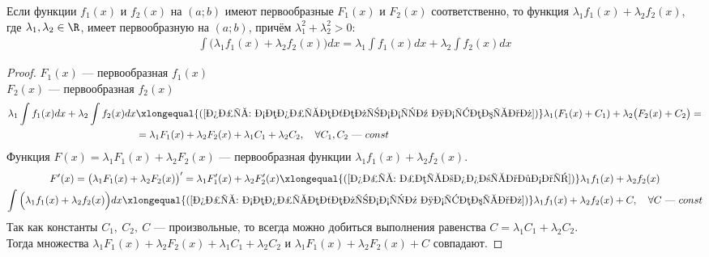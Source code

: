 \begin{property}
    Если функции $f_1(x)$ и $f_2(x)$ на $(a;b)$ имеют первообразные $F_1(x)$ и $F_2(x)$ соответственно, то функция $\lambda_1 f_1(x) + \lambda_2 f_2(x)$, где $\lambda_1, \lambda_2 \in \R$, имеет первообразную на $(a;b)$, причём $\lambda_1^2 + \lambda_2^2 > 0\colon$
    \begin{gather*}
        \int\Big(\lambda_1 f_1(x) + \lambda_2 f_2(x)\Big)dx = \lambda_1 \int f_1(x)dx + \lambda_2 \int f_2(x)dx
    \end{gather*}
\end{property}
\begin{proof}
    $F_1(x)$ --- первообразная $f_1(x)$\\
    $F_2(x)$ --- первообразная $f_2(x)$\\
    \begin{align*}
        \lambda_1 \int f_1(x)dx + \lambda_2 \int f_2(x)dx &\xlongequal{(\ref{опр: неопределённый интеграл})} \lambda_1 (F_1(x) + C_1) + \lambda_2 \big(F_2(x) + C_2\big) = \\
        &= \lambda_1 F_1(x) + \lambda_2 F_2(x) + \lambda_1 C_1 + \lambda_2 C_2,\quad \forall C_1, C_2 \text{ --- } const
    \end{align*}
    Функция $F(x) = \lambda_1 F_1(x) + \lambda_2 F_2(x)$ --- первообразная функции $\lambda_1 f_1(x) + \lambda_2 f_2 (x)$.
    \begin{gather*}
        F'(x) = \big(\lambda_1 F_1(x) + \lambda_2 F_2 (x)\big)' = \lambda_1 F_1'(x) + \lambda_2 F_2'(x) \xlongequal{(\ref{опр: первообразная})} \lambda_1 f_1(x) + \lambda_2 f_2(x)\\
        \int \Big(\lambda_1 f_1(x) + \lambda_2 f_2(x)\Big)dx \xlongequal{(\ref{опр: неопределённый интеграл})} \lambda_1 f_1(x) + \lambda_2 f_2(x) + C,\quad \forall C \text{ --- } const
    \end{gather*}
    Так как константы $C_1,\ C_2,\ C$ --- произвольные, то всегда можно добиться выполнения равенства $C = \lambda_1 C_1 + \lambda_2 C_2$. \\
    Тогда множества $\lambda_1 F_1(x) + \lambda_2 F_2(x) + \lambda_1 C_1 + \lambda_2 C_2$ и $\lambda_1 F_1(x) + \lambda_2 F_2(x) + C$ совпадают.
\end{proof}

